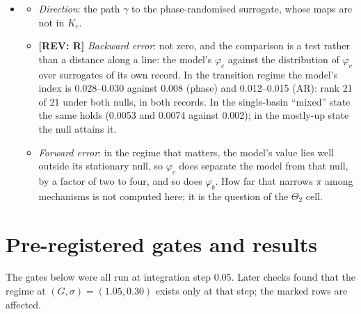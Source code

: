 \documentclass[11pt]{article}
\newcommand{\REV}[1]{\textcolor{purple!70!black}{\textbf{[REV: #1]}}}
\newenvironment{newtext}{\par\color{teal!55!black}}{\par}
\begin{document}
\begin{itemize}
\begin{itemize}
  \item \emph{Forward error}: undetermined until that number is in hand. The index separates the model from linear stationary nulls, so whether a rival mechanism on the same connectome attains the paper's value is what decides whether it identifies the regime. One does: the two-state reduction, from one start, attains it exactly. So $\varphi_c$ does not identify the regime against that rival, and the statistic that does is the histogram. Rivals of the published kinds, near-Hopf and metastable, have not been run on this connectome.
  \end{itemize}
\item[$\Theta_3$]
  \begin{itemize}
  \item \emph{Direction}: the path $\gamma$ to the phase-randomised surrogate, whose maps are not in $K_c$.
  \item \REV{R} \emph{Backward error}: not zero, and the comparison is a test rather than a distance along a line: the model's $\varphi_c$ against the distribution of $\varphi_c$ over surrogates of its own record. In the transition regime the model's index is 0.028--0.030 against 0.008 (phase) and 0.012--0.015 (AR): rank 21 of 21 under both nulls, in both records. In the single-basin ``mixed'' state the same holds (0.0053 and 0.0074 against 0.002); in the mostly-up state the null attains it.
  \item \emph{Forward error}: in the regime that matters, the model's value lies well outside its stationary null, so $\varphi_c$ does separate the model from that null, by a factor of two to four, and so does $\varphi_b$. How far that narrows $\pi$ among mechanisms is not computed here; it is the question of the $\Theta_2$ cell.
  \end{itemize}
\end{itemize}


\section{Pre-registered gates and results}\label{app:gates}
\begin{newtext}
The gates below were all run at integration step 0.05. Later checks found that the regime at $(G,\sigma)=(1.05,0.30)$ exists only at that step; the marked rows are affected.
\end{newtext}
\end{document}
